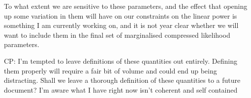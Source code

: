 \documentclass[preprintnumbers,prd,superscriptaddress,notitlepage,nofootinbib] {revtex4-1}
\newcommand{\CP}[1]{{\color{red}CP: #1}}
\begin{document}
To what extent we are sensitive to these parameters, and the effect that opening
up some variation in them will have on our constraints on the linear power is
something I am currently working on, and it is not year clear whether we will
want to include them in the final set of marginalised compressed likelihood
parameters.

\CP{I'm tempted to leave definitions of these quantities out entirely.
Defining them properly will require a fair bit of volume and could end
up being distracting. Shall we leave a thorough definition of these
quantities to a future document? I'm aware what I have right now
isn't coherent and self contained}



\end{document}
